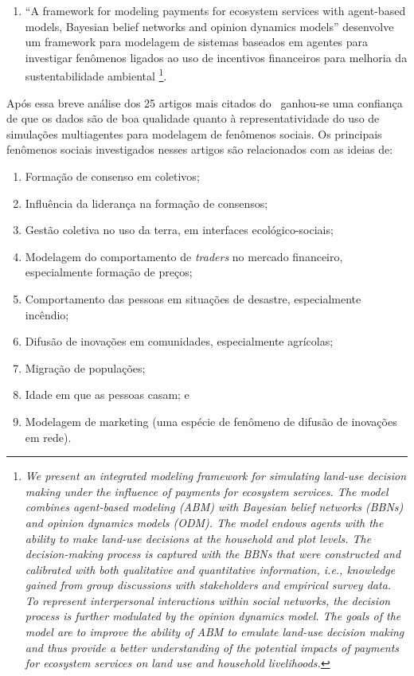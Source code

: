\begin{enumerate}
\item ``A framework for modeling payments for ecosystem services with agent-based models, Bayesian belief networks and opinion dynamics models'' desenvolve um framework para modelagem de sistemas baseados em agentes para investigar fenômenos ligados ao uso de incentivos financeiros para melhoria da sustentabilidade ambiental \footnote{\textit{We present an integrated modeling framework for simulating land-use decision making under the influence of payments for ecosystem services. The model combines agent-based modeling (ABM) with Bayesian belief networks (BBNs) and opinion dynamics models (ODM). The model endows agents with the ability to make land-use decisions at the household and plot levels. The decision-making process is captured with the BBNs that were constructed and calibrated with both qualitative and quantitative information, i.e., knowledge gained from group discussions with stakeholders and empirical survey data. To represent interpersonal interactions within social networks, the decision process is further modulated by the opinion dynamics model. The goals of the model are to improve the ability of ABM to emulate land-use decision making and thus provide a better understanding of the potential impacts of payments for ecosystem services on land use and household livelihoods. }}.
\end{enumerate}

Após essa breve análise dos 25 artigos mais citados do \dataset\ ganhou-se uma confiança de que os dados são de boa qualidade quanto à representatividade do uso de simulações multiagentes para modelagem de fenômenos sociais. Os principais fenômenos sociais investigados nesses artigos são relacionados com as ideias de:
\begin{enumerate}
    \item Formação de consenso em coletivos;
    \item Influência da liderança na formação de consensos;
    \item Gestão coletiva no uso da terra, em interfaces ecológico-sociais;
    \item Modelagem do comportamento de \textit{traders} no mercado financeiro, especialmente formação de preços;
    \item Comportamento das pessoas em situações de desastre, especialmente incêndio;
    \item Difusão de inovações em comunidades, especialmente agrícolas;
    \item Migração de populações; 
    \item Idade em que as pessoas casam; e
    \item Modelagem de marketing (uma espécie de fenômeno de difusão de inovações em rede).
\end{enumerate}

